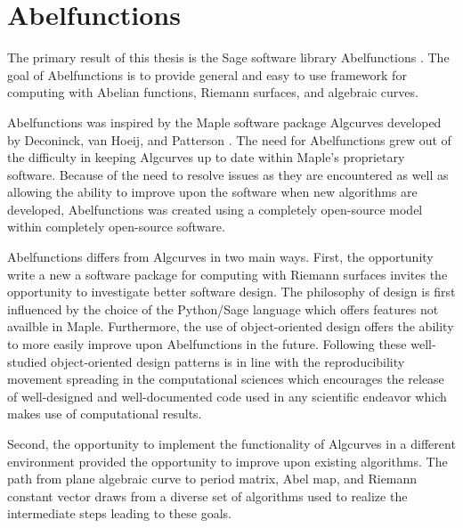 \chapter{Abelfunctions} \label{ch:abelfunctions}

The primary result of this thesis is the Sage software library Abelfunctions
\cite{abelfunctions}. The goal of Abelfunctions is to provide general and easy
to use framework for computing with Abelian functions, Riemann surfaces, and
algebraic curves.

Abelfunctions was inspired by the Maple software package Algcurves developed by
Deconinck, van Hoeij, and Patterson \cite{DeconinckPatterson11}. The need for
Abelfunctions grew out of the difficulty in keeping Algcurves up to date within
Maple's proprietary software. Because of the need to resolve issues as they are
encountered as well as allowing the ability to improve upon the software when
new algorithms are developed, Abelfunctions was created using a completely
open-source model within completely open-source software.

Abelfunctions differs from Algcurves in two main ways. First, the opportunity
write a new a software package for computing with Riemann surfaces invites the
opportunity to investigate better software design. The philosophy of design is
first influenced by the choice of the Python/Sage language which offers features
not availble in Maple. Furthermore, the use of object-oriented design offers the
ability to more easily improve upon Abelfunctions in the future. Following these
well-studied object-oriented design patterns \cite{gamma1995design} is in line
with the reproducibility movement spreading in the computational sciences
\cite{stodden2012reproducible} which encourages the release of well-designed and
well-documented code used in any scientific endeavor which makes use of
computational results.

Second, the opportunity to implement the functionality of Algcurves in a
different environment provided the opportunity to improve upon existing
algorithms. The path from plane algebraic curve to period matrix, Abel map, and
Riemann constant vector draws from a diverse set of algorithms used to realize
the intermediate steps leading to these goals.

